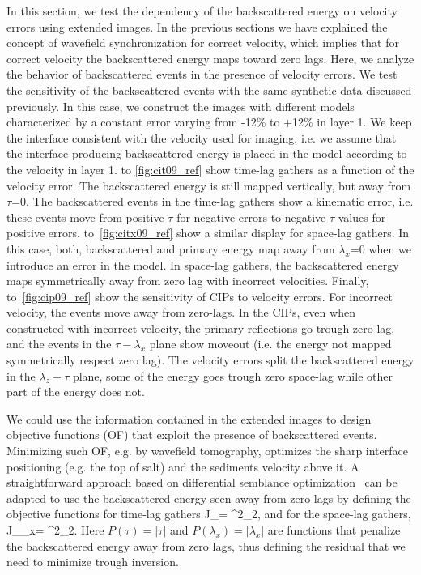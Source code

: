 In this section, we test the dependency of the backscattered energy on velocity errors using extended images. In the previous sections 
we have explained the concept of wavefield synchronization for correct velocity, which implies that for correct velocity the backscattered energy maps 
toward zero lags. Here, we analyze the behavior of backscattered events in the presence of velocity errors.
We test the sensitivity of the backscattered events with the same synthetic data discussed previously. In this case, we construct the images
with different models characterized by a constant error varying from -12\% to +12\% in layer 1. We keep the interface 
consistent with the velocity used for imaging, i.e. we assume that the interface producing backscattered energy is placed in the model
according to the velocity in layer 1.
 to \ref{fig:cit09_ref} show time-lag gathers as a function of the velocity error.
 The backscattered energy is still mapped vertically, but away from $\tau$=$0$. 
The backscattered events in the time-lag gathers show a kinematic error, i.e. these events move from positive $\tau$
for negative errors to negative $\tau$ values for positive errors. 
%
 to~\ref{fig:citx09_ref} show a similar display for space-lag gathers. 
 In this case, both, backscattered and primary energy map away from $\lambda_x$=$0$ when we introduce an error in the model. 
 In space-lag gathers, the backscattered energy maps symmetrically away from zero lag with incorrect velocities. 
%
Finally,~ to~\ref{fig:cip09_ref} show the sensitivity of CIPs to velocity errors. For incorrect velocity, the events
move away from zero-lags. In the CIPs, even when constructed with incorrect velocity, the primary reflections go trough zero-lag, and the events in
 the $\tau-\lambda_x$ plane show moveout (i.e. the energy not mapped symmetrically respect zero lag). 
The velocity errors split the backscattered energy in the $\lambda_z-\tau$ plane, some of the energy goes trough zero space-lag while other part
of the energy does not.

We could use the information contained in the extended images to design objective functions (OF) that exploit the presence of backscattered events. 
Minimizing such OF, e.g. by wavefield tomography, optimizes the sharp interface positioning (e.g. the top of salt) and the sediments velocity above it.
A straightforward approach based on differential semblance optimization~\citep{shen:2132} can be adapted to use
 the backscattered energy seen away from zero lags by defining the objective functions for time-lag gathers
\beq
 J_{\tau}=  ^2_2,
\label{eq:of1}
\eeq 
and for the space-lag gathers,
\beq
 J_{\lambda_x}=  ^2_2.
\label{eq:of2}
\eeq 
%
Here $P(\tau)=|\tau|$ and $P(\lambda_x)=|\lambda_x|$ are functions that penalize the backscattered energy away 
from zero lags, thus defining the residual that we need to minimize trough inversion.

